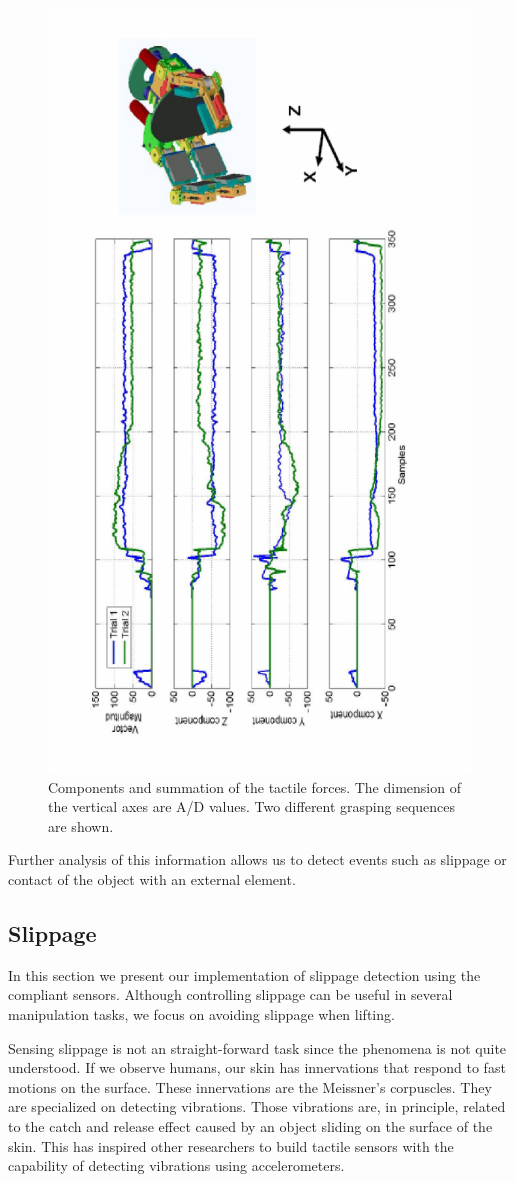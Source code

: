  \begin{figure}[tbp]
 \centerline{
 \includegraphics[height=\columnwidth, angle=270]{./figures/TactileComp.eps}
 }\caption[Tactile forces on grasping events]{Components and summation of the tactile forces.
 The dimension of the vertical axes are A/D values.
 Two different grasping sequences are shown.} \label{fig:TactileComp}
 \end{figure}


Further analysis of this information allows us to detect events
such as slippage or contact of the object with an external
element.



\subsection{Slippage}
\label{sec:slippage}

In this section we present our implementation of slippage
detection using the compliant sensors. Although controlling
slippage can be useful in several manipulation tasks, we focus on
avoiding slippage when lifting.


Sensing slippage is not an straight-forward task since the
phenomena is not quite understood. If we observe humans, our skin
has innervations that respond to fast motions on the surface.
These innervations are the Meissner's corpuscles. They are
specialized on detecting vibrations. Those vibrations are, in
principle, related to the catch and release effect caused by an
object sliding on the surface of the skin. This has inspired other
researchers to build tactile sensors with the capability of
detecting vibrations using accelerometers\cite{howe89sensing}.

